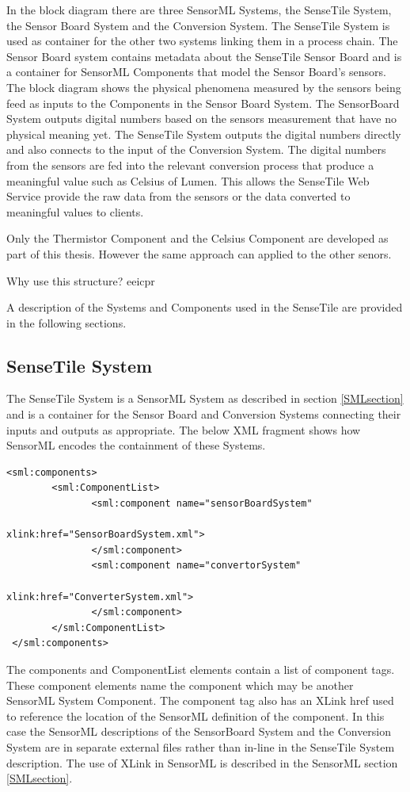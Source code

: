 \documentclass[]{final_report}
\begin{document}
In the block diagram there are three SensorML Systems, the SenseTile System, the Sensor Board System and the Conversion System. The SenseTile System is used as container for the other two systems linking them in a process chain. The Sensor Board system contains metadata about the SenseTile Sensor Board and is a container for SensorML Components that model the Sensor Board's sensors. The block diagram shows the physical phenomena measured by the sensors being feed as inputs to the Components in the Sensor Board System. The SensorBoard System outputs digital numbers based on the sensors measurement that have no physical meaning yet. The SenseTile System outputs the digital numbers directly and also connects to the input of the Conversion System. The digital numbers from the sensors are fed into the relevant conversion process that produce a meaningful value such as Celsius of Lumen. This allows the SenseTile Web Service provide the raw data from the sensors or the data converted to meaningful values to clients.

Only the Thermistor Component and the Celsius Component are developed as part of this thesis. However the same approach can applied to the other senors.

Why use this structure? eeicpr

A description of the Systems and Components used in the SenseTile are provided in the following sections.

\subsection{SenseTile System}
The SenseTile System is a SensorML System as described in section \ref{SMLsection} and is a container for the Sensor Board and Conversion Systems connecting their inputs and outputs as appropriate. The below XML fragment shows how SensorML encodes the containment of these Systems. 
\lstset{language=XML,basicstyle=\scriptsize,frame=single}
\begin{lstlisting}
<sml:components>
        <sml:ComponentList>
               <sml:component name="sensorBoardSystem" 
                                          xlink:href="SensorBoardSystem.xml">
               </sml:component>
               <sml:component name="convertorSystem"  
                                          xlink:href="ConverterSystem.xml">
               </sml:component>
        </sml:ComponentList>			   
 </sml:components>
\end{lstlisting}
The components and ComponentList elements contain a list of component tags. These component elements name the component which may be another SensorML System  Component. The component tag also has an XLink href used to reference the location of the SensorML definition of the component.  In this case the SensorML descriptions of the SensorBoard System and the Conversion System are in separate external files rather than in-line in the SenseTile System description. The use of XLink in SensorML is described in the SensorML section \ref{SMLsection}.
\end{document}
